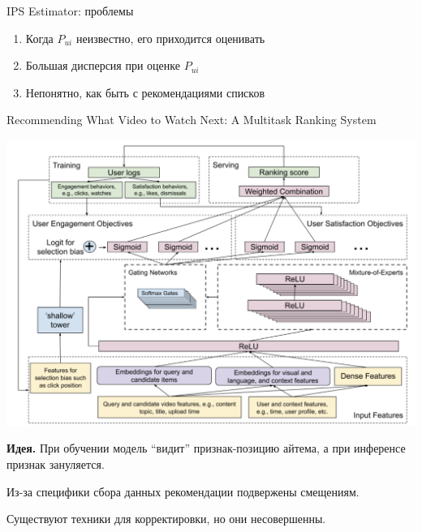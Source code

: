 \documentclass[11pt,aspectratio=169,handout]{beamer}
\begin{document}
\begin{frame}{IPS Estimator: проблемы}

\begin{enumerate}
\item Когда $P_{ui}$ неизвестно, его приходится оценивать
\item Большая дисперсия при оценке $P_{ui}$
\item Непонятно, как быть с рекомендациями списков
\end{enumerate}

\end{frame}

\begin{frame}{Recommending What Video to Watch Next: A Multitask Ranking System \cite{YT}}

\begin{center}
\includegraphics[scale=0.2]{images/multitask.png}
\end{center}

{\bf Идея.} При обучении модель ``видит'' признак-позицию айтема, а при инференсе признак зануляется. 

\end{frame}

\begin{frame}

\begin{tcolorbox}[colback=info!5,colframe=info!80,title=]
Из-за специфики сбора данных рекомендации подвержены смещениям. 
\end{tcolorbox}
\begin{tcolorbox}[colback=info!5,colframe=info!80,title=]
Существуют техники для корректировки, но они несовершенны.
\end{tcolorbox}

\end{frame}
\end{document}
